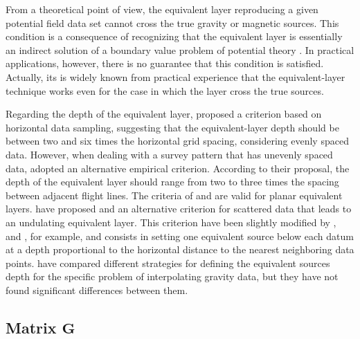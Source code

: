 From a theoretical point of view, the equivalent layer reproducing a given potential field data set cannot cross the
true gravity or magnetic sources. This condition is a consequence of recognizing that the equivalent layer is essentially an indirect solution of 
a boundary value problem of potential theory \citep[e.g.,][]{roy1962,zidarov1965,dampney1969,li_etal_2014,reis-etal2020}.
In practical applications, however, there is no guarantee that this condition is satisfied. 
Actually, its is widely known from practical experience \cite[e.g.,][]{gonzalez-etal2022} that the equivalent-layer technique
works even for the case in which the layer cross the true sources. 

Regarding the depth of the equivalent layer, \citet{dampney1969}  proposed a criterion based on horizontal data sampling, 
suggesting that the equivalent-layer depth should be between two and six times the horizontal grid spacing, 
considering evenly spaced data. 
However, when dealing with a survey pattern that has unevenly spaced data, \citet{reis-etal2020} adopted an alternative 
empirical criterion. 
According to their proposal, the depth of the equivalent layer should range from two to three times the spacing between 
adjacent flight lines.
The criteria of \citet{dampney1969} and \citet{reis-etal2020} are valid for planar equivalent layers. 
\citet{cordell1992} have proposed and an alternative criterion for scattered data that leads to an undulating equivalent layer.
This criterion have been slightly modified by \citet{guspi-etal2004}, \citet{guspi-novara2009} and \citet{soler-uieda2021},
for example, and consists in setting one equivalent source below each datum at a depth 
proportional to the horizontal distance to the nearest neighboring data points.
\citet{soler-uieda2021} have compared different strategies for defining the equivalent sources depth for the specific
problem of interpolating gravity data, but they have not found significant differences between them.


\subsection{Matrix $\mathbf{G}$}
\label{subsec:sensitivity-matrix}

